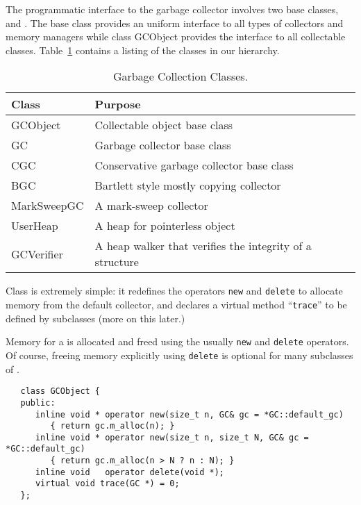 
   The programmatic interface to the garbage collector involves two
base classes,  and .  The base class 
 provides an uniform interface to all types of collectors 
and memory
managers while class {\sf GCObject} provides the interface to all 
collectable classes.  Table~\ref{GC-Classes} contains a listing
of the classes in our hierarchy.

\begin{table}
   \begin{center}
      \begin{tabular}{|l|l|} \hline
        Class           & Purpose \\ \hline \hline
        \sf GCObject    & Collectable object base class \\
        \sf GC          & Garbage collector base class \\
        \sf CGC         & Conservative garbage collector base class \\
        \sf BGC         & Bartlett style mostly copying collector \\
        \sf MarkSweepGC & A mark-sweep collector \\
        \sf UserHeap    & A heap for pointerless object \\
        \sf GCVerifier  & A heap walker that verifies the integrity of a 
                          structure \\
      \hline 
      \end{tabular}
   \end{center}
   \caption{\label{GC-Classes} Garbage Collection Classes.}
\end{table}

Class  is extremely simple: it redefines the operators
\verb|new| and \verb|delete| to allocate memory from the default collector,
and declares a virtual method ``\verb|trace|'' to be defined by subclasses
(more on this later.)

Memory for a  is allocated and freed using the usually
\verb|new| and \verb|delete| operators.  Of course, freeing memory explicitly
using \verb|delete| is optional for many subclasses of . 

\begin{verbatim}
   class GCObject {
   public:
      inline void * operator new(size_t n, GC& gc = *GC::default_gc) 
         { return gc.m_alloc(n); }
      inline void * operator new(size_t n, size_t N, GC& gc = *GC::default_gc) 
         { return gc.m_alloc(n > N ? n : N); }
      inline void   operator delete(void *);
      virtual void trace(GC *) = 0;
   };
\end{verbatim}

